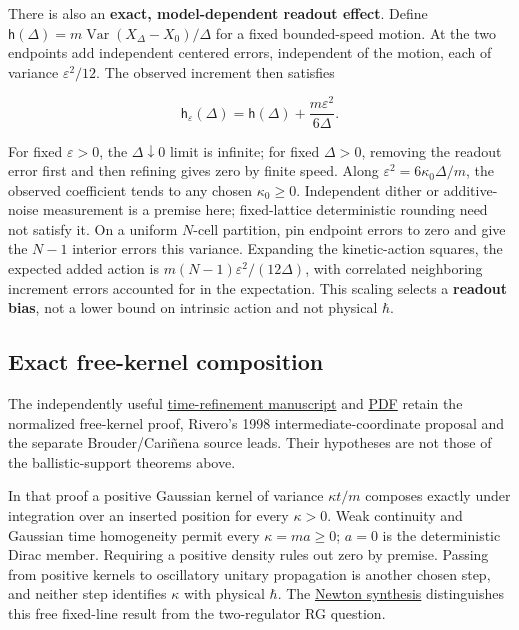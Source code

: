 \documentclass[11pt,a4paper]{article}
\begin{document}
There is also an \textbf{exact, model-dependent readout effect}. Define
\(\mathsf h(\Delta)=m\operatorname{Var}(X_\Delta-X_0)/\Delta\) for a
fixed bounded-speed motion. At the two endpoints add independent
centered errors, independent of the motion, each of variance
\(\varepsilon^2/12\). The observed increment then satisfies

\[\mathsf h_\varepsilon(\Delta)
=\mathsf h(\Delta)+\frac{m\varepsilon^2}{6\Delta}.\]

For fixed \(\varepsilon>0\), the \(\Delta\downarrow0\) limit is
infinite; for fixed \(\Delta>0\), removing the readout error first and
then refining gives zero by finite speed. Along
\(\varepsilon^2=6\kappa_0\Delta/m\), the observed coefficient tends to
any chosen \(\kappa_0\ge0\). Independent dither or additive-noise
measurement is a premise here; fixed-lattice deterministic rounding need
not satisfy it. On a uniform \(N\)-cell partition, pin endpoint errors
to zero and give the \(N-1\) interior errors this variance. Expanding
the kinetic-action squares, the expected added action is
\(m(N-1)\varepsilon^2/(12\Delta)\), with correlated neighboring
increment errors accounted for in the expectation. This scaling selects
a \textbf{readout bias}, not a lower bound on intrinsic action and not
physical \(\hbar\).

\hypertarget{exact-free-kernel-composition}{%
\subsection{Exact free-kernel
composition}\label{exact-free-kernel-composition}}

The independently useful
\href{../papers/time-refinement.tex}{time-refinement manuscript} and
\href{../out/papers/time-refinement.pdf}{PDF} retain the normalized
free-kernel proof, Rivero's 1998 intermediate-coordinate proposal and
the separate Brouder/Cariñena source leads. Their hypotheses are not
those of the ballistic-support theorems above.

In that proof a positive Gaussian kernel of variance \(\kappa t/m\)
composes exactly under integration over an inserted position for every
\(\kappa>0\). Weak continuity and Gaussian time homogeneity permit every
\(\kappa=ma\ge0\); \(a=0\) is the deterministic Dirac member. Requiring
a positive density rules out zero by premise. Passing from positive
kernels to oscillatory unitary propagation is another chosen step, and
neither step identifies \(\kappa\) with physical \(\hbar\). The
\href{groupoid-quantum-newton-states.md\#6-regulators-and-a-normalized-blocking-test}{Newton
synthesis} distinguishes this free fixed-line result from the
two-regulator RG question.
\end{document}
